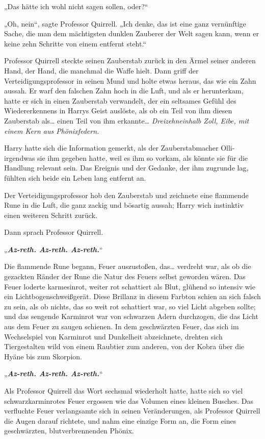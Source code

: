 {„Das hätte ich wohl nicht sagen sollen, oder?“

„Oh, nein“, sagte Professor Quirrell. „Ich denke, das ist eine ganz vernünftige Sache, die man dem mächtigsten dunklen Zauberer der Welt sagen kann, wenn er keine zehn Schritte von einem entfernt steht.“

Professor Quirrell steckte seinen Zauberstab zurück in den Ärmel seiner anderen Hand, der Hand, die manchmal die Waffe hielt. Dann griff der Verteidigungsprofessor in seinen Mund und holte etwas heraus, das wie ein Zahn aussah. Er warf den falschen Zahn hoch in die Luft, und als er herunterkam, hatte er sich in einen Zauberstab verwandelt, der ein seltsames Gefühl des Wiedererkennens in Harrys Geist auslöste, als ob ein Teil von ihm diesen Zauberstab als… einen Teil von ihm erkannte… \emph{Dreizehneinhalb Zoll, Eibe, mit einem Kern aus Phönixfedern.}

Harry hatte sich die Information gemerkt, als der Zauberstabmacher Olli-irgendwas sie ihm gegeben hatte, weil es ihm so vorkam, als könnte sie für die Handlung relevant sein. Das Ereignis und der Gedanke, der ihm zugrunde lag, fühlten sich beide ein Leben lang entfernt an.

Der Verteidigungsprofessor hob den Zauberstab und zeichnete eine flammende Rune in die Luft, die ganz zackig und bösartig aussah; Harry wich instinktiv einen weiteren Schritt zurück.

Dann sprach Professor Quirrell.

„\textbf{\emph{Az-reth. Az-reth. Az-reth.}}“

Die flammende Rune begann, Feuer auszustoßen, das… verdreht war, als ob die gezackten Ränder der Rune die Natur des Feuers selbst geworden wären. Das Feuer loderte karmesinrot, weiter rot schattiert als Blut, glühend so intensiv wie ein Lichtbogenschweißgerät. Diese Brillanz in diesem Farbton schien an sich falsch zu sein, als ob nichts, das so weit rot schattiert war, so viel Licht abgeben sollte; und das sengende Karminrot war von schwarzen Adern durchzogen, die das Licht aus dem Feuer zu saugen schienen. In dem geschwärzten Feuer, das sich im Wechselspiel von Karminrot und Dunkelheit abzeichnete, drehten sich Tiergestalten wild von einem Raubtier zum anderen, von der Kobra über die Hyäne bis zum Skorpion.

„\textbf{\emph{Az-reth. Az-reth. Az-reth.}}“

Als Professor Quirrell das Wort sechsmal wiederholt hatte, hatte sich so viel schwarzkarminrotes Feuer ergossen wie das Volumen eines kleinen Busches. Das verfluchte Feuer verlangsamte sich in seinen Veränderungen, als Professor Quirrell die Augen darauf richtete, und nahm eine einzige Form an, die Form eines geschwärzten, blutverbrennenden Phönix.

}
